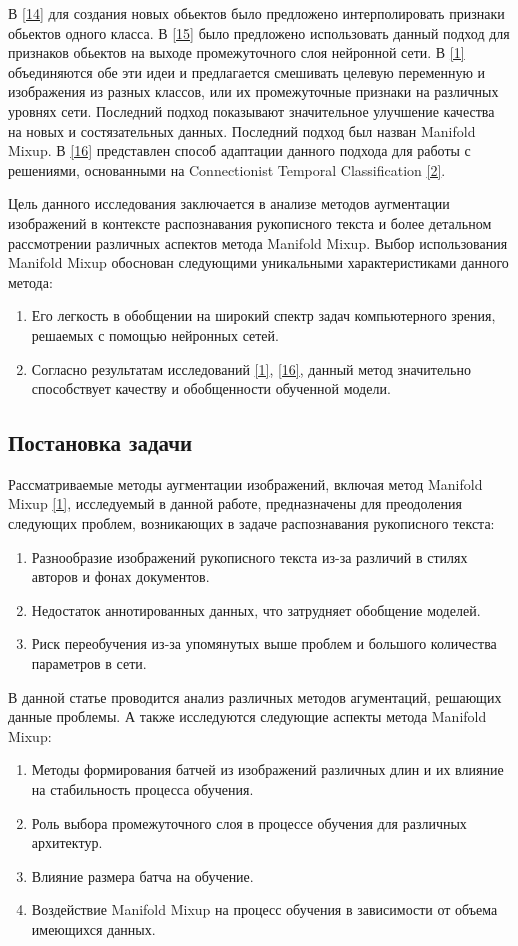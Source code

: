 В \hyperlink{cite.Cha11}{[14]} для создания новых обьектов было предложено интерполировать признаки обьектов одного класса. В \hyperlink{cite.Dev17}{[15]} было предложено использовать данный подход для признаков обьектов на выходе промежуточного слоя нейронной сети. В \hyperlink{cite.Ver18}{[1]} объединяются обе эти идеи и предлагается смешивать целевую переменную и изображения из разных классов, или их промежуточные признаки на различных уровнях сети. Последний подход показывают значительное улучшение качества на новых и состязательных данных. Последний подход был назван Manifold Mixup. В \hyperlink{cite.Bas19}{[16]} представлен способ адаптации данного подхода для работы с решениями, основанными на Connectionist Temporal Classification \hyperlink{cite.Gra06}{[2]}.

Цель данного исследования заключается в анализе методов аугментации изображений в контексте распознавания рукописного текста и более детальном рассмотрении различных аспектов метода Manifold Mixup. Выбор использования Manifold Mixup обоснован следующими уникальными характеристиками данного метода:
\begin{enumerate}
\item Его легкость в обобщении на широкий спектр задач компьютерного зрения, решаемых с помощью нейронных сетей.
\item Согласно результатам исследований \hyperlink{cite.Ver18}{[1]}, \hyperlink{cite.Bas19}{[16]}, данный метод значительно способствует качеству и обобщенности обученной модели.
\end{enumerate}
 
\subsection{Постановка задачи}
Рассматриваемые методы аугментации изображений, включая метод Manifold Mixup \hyperlink{cite.Ver18}{[1]}, исследуемый в данной работе, предназначены для преодоления следующих проблем, возникающих в задаче распознавания рукописного текста:
\begin{enumerate}
\item Разнообразие изображений рукописного текста из-за различий в стилях авторов и фонах документов.
\item Недостаток аннотированных данных, что затрудняет обобщение моделей.
\item Риск переобучения из-за упомянутых выше проблем и большого количества параметров в сети.
\end{enumerate}
В данной статье проводится анализ различных методов агументаций, решающих данные проблемы. А также исследуются следующие аспекты метода Manifold Mixup:
\begin{enumerate}
\item Методы формирования батчей из изображений различных длин и их влияние на стабильность процесса обучения.
\item Роль выбора промежуточного слоя в процессе обучения для различных архитектур.
\item Влияние размера батча на обучение.
\item Воздействие Manifold Mixup на процесс обучения в зависимости от объема имеющихся данных.
\end{enumerate}

